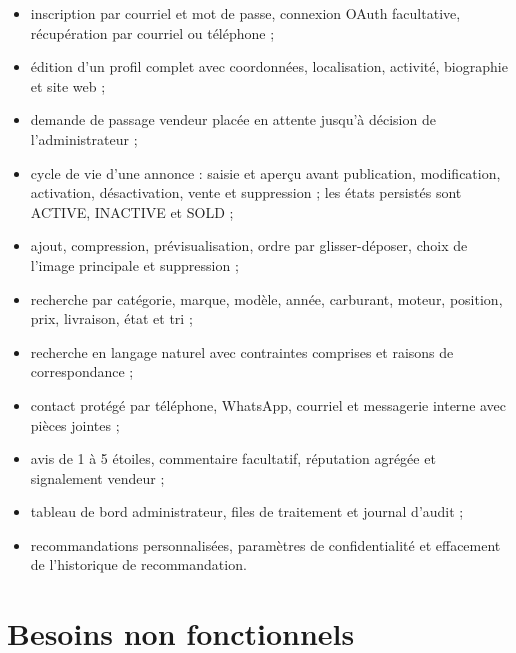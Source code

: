 \begin{itemize}
\item inscription par courriel et mot de passe, connexion OAuth facultative, récupération par courriel ou téléphone ;

\item édition d'un profil complet avec coordonnées, localisation, activité, biographie et site web ;

\item demande de passage vendeur placée en attente jusqu'à décision de l'administrateur ;

\item cycle de vie d'une annonce : saisie et aperçu avant publication, modification, activation, désactivation, vente et suppression ; les états persistés sont ACTIVE, INACTIVE et SOLD ;

\item ajout, compression, prévisualisation, ordre par glisser-déposer, choix de l'image principale et suppression ;

\item recherche par catégorie, marque, modèle, année, carburant, moteur, position, prix, livraison, état et tri ;

\item recherche en langage naturel avec contraintes comprises et raisons de correspondance ;

\item contact protégé par téléphone, WhatsApp, courriel et messagerie interne avec pièces jointes ;

\item avis de 1 à 5 étoiles, commentaire facultatif, réputation agrégée et signalement vendeur ;

\item tableau de bord administrateur, files de traitement et journal d'audit ;

\item recommandations personnalisées, paramètres de confidentialité et effacement de l'historique de recommandation.
\end{itemize}

\section{Besoins non fonctionnels}

